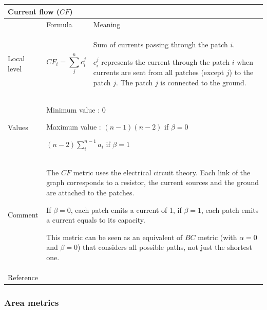 \documentclass{article}
\begin{document}
\begin{table}[H]
	\begin{tabular}{|m{3.24cm}|m{4.4810004cm}m{7.924cm}|}
		\hline
		\multicolumn{3}{|m{16.044998cm}|}{Current flow ($CF$)}\\\hline
		&
		\multicolumn{1}{m{4.4810004cm}|}{Formula} &
		Meaning\\\hline
		Local level &
		\multicolumn{1}{m{4.4810004cm}|}{
			\begin{equation*}
			CF_{i}=\sum_{j}^n{c_i^j}
			\end{equation*}
		} &
		Sum of currents passing through the patch $i$.
		
		$c_i^j$ represents the current through the patch $i$ when currents are sent from all patches (except $j$) to the patch $j$. The patch $j$ is connected to the ground.
		
		\\\hline
		Values &
		\multicolumn{2}{m{12.6050005cm}|}{			
			Minimum value : 0
			
			Maximum value : $(n-1)(n-2)$ if $\beta=0$
			
			$(n-2)\sum_i^{n-1} a_i$ if $\beta=1$
			
		}\\\hline
		Comment &
		\multicolumn{2}{m{12.6050005cm}|}{
			The $CF$ metric uses the electrical circuit theory. Each link of the graph corresponds to a resistor, the current sources and the ground are attached to the patches.
			
			If $\beta=0$, each patch emits a current of 1, if $\beta=1$, each patch emits a current equals to its capacity.
			
			This metric can be seen as an equivalent of $BC$ metric (with $\alpha=0$ and $\beta=0$) that considers all possible paths, not just the shortest one.
			
		}\\\hline
		Reference &
		\multicolumn{2}{m{12.6050005cm}|}{		
			\cite{2015_collisions}
		}\\\hline
	\end{tabular}
\end{table}

\subsubsection{Area metrics}
\end{document}
